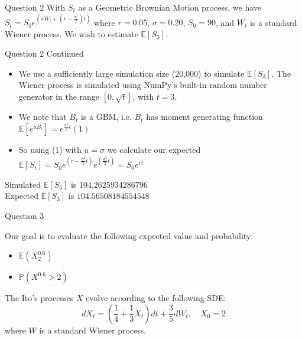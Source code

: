 \documentclass[compress,12pt]{beamer}
\begin{document}
\begin{frame}{Question 2}
    With $S_t$ as a Geometric Brownian Motion process, we have $S_t = S_0e^{(\sigma W_t + (r - \frac{\sigma^2}{2})t)}$ where $r = 0.05$, $\sigma = 0.20$, $S_0 = 90$, and $W_t$ is a standard Wiener process. We wish to estimate $\mathbb{E}[S_3]$.
\end{frame}

\begin{frame}{Question 2 Continued}

    \begin{itemize}
        \item We use a sufficiently large simulation size (20,000) to simulate $\mathbb{E}[S_3]$. The Wiener process is simulated using NumPy's
        built-in random number generator in the range $[0, \sqrt{t}]$, with $t = 3$.
        \item We note that $B_t$ is a GBM, i.e. $B_t$ has moment generating function $\mathbb{E}[e^{uB_t}] = e^{\frac{u^2}{2}t} (1)$
        \item So using (1) with $u=\sigma$ we calculate our expected $\mathbb{E}[S_t] = S_0e^{({r-\frac{\sigma^2}{2}t})}e^{(\frac{\sigma^2}{2}t)} = S_0e^{rt}$
    
    \end{itemize}

    \begin{tcolorbox}
        Simulated $\mathbb{E}[S_3]$ is $\boxed{104.2625934286796}$\\
        Expected $\mathbb{E}[S_3]$ is $\boxed{104.56508184554548}$
    \end{tcolorbox}
\end{frame}


\begin{frame}{Question 3}

    Our goal is to evaluate the following expected value and probability:
    \begin{itemize}
        \item $\mathbb{E}(X^{0.6}_{2})$
        \item $\mathbb{P}(X^{0.6}> 2)$
    \end{itemize}

    The Ito's processes $X$ evolve according to the following SDE:
    \begin{equation*}
        dX_t = \left( \frac{1}{4} + \frac{1}{3}X_t \right) dt + \frac{3}{5} dW_t, \quad X_0 = 2
    \end{equation*}
    where $W$ is a standard Wiener process.

\end{frame}
\end{document}

